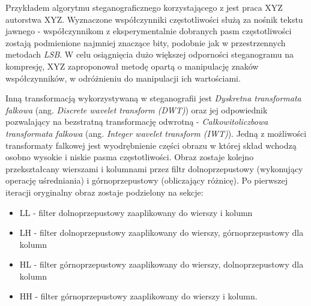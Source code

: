 {    %
    Przykładem algorytmu steganograficznego korzystającego z  jest praca XYZ autorstwa XYZ. Wyznaczone współczynniki częstotliwości służą za nośnik
    tekstu jawnego - współczynnikom z eksperymentalnie dobranych pasm częstotliwości zostają podmienione najmniej znaczące bity, podobnie jak w przestrzennych
    metodach \textit{LSB}. W celu osiągnięcia dużo większej odporności steganogramu na kompresję, XYZ zaproponował metodę opartą o manipulację znaków współczynników,
    w odróżnieniu do manipulacji ich wartościami. %

    Inną transformacją wykorzystywaną w steganografii jest \textit{Dyskretna transformata falkowa} (ang. \textit{Discrete wavelet transform (DWT)}) oraz jej odpowiednik
    pozwalający na bezstratną transformację odwrotną - \textit{Całkowitoliczbowa transformata falkowa} (ang. \textit{Integer wavelet transform (IWT)}).
    Jedną z możliwości transformaty falkowej jest wyodrębnienie części obrazu w której skład wchodzą osobno wysokie i niskie pasma częstotliwości.
    Obraz zostaje kolejno przekształcany wierszami i kolumnami przez filtr dolnoprzepustowy (wykonujący operację uśredniania) i górnoprzepustowy (obliczający różnicę).
    Po pierwszej iteracji oryginalny obraz zostaje podzielony na sekcje:
    \begin{itemize}
        \item LL - filter dolnoprzepustowy zaaplikowany do wierszy i kolumn
        \item LH - filter dolnoprzepustowy zaaplikowany do wierszy, górnoprzepustowy dla kolumn
        \item HL - filter górnoprzepustowy zaaplikowany do wierszy, dolnoprzepustowy dla kolumn
        \item HH - filter górnoprzepustowy zaaplikowany do wierszy i kolumn.
    \end{itemize}

}
